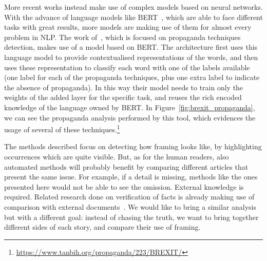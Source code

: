 More recent works instead make use of complex models based on neural networks. With the advance of language models like BERT~\cite{devlin2018bert}, which are able to face different tasks with great results, more models are making use of them for almost every problem in NLP.
The work of~\citet{da2019fine}, which is focused on propaganda techniques detection, makes use of a model based on BERT.
The architecture first uses this language model to provide contextualised representations of the words, and then uses these representation to classify each word with one of the labels available (one label for each of the propaganda techniques, plus one extra label to indicate the absence of propaganda).
In this way their model needs to train only the weights of the added layer for the specific task, and reuses the rich encoded knowledge of the language owned by BERT.
In Figure~\ref{fig:brexit_propaganda}, we can see the propaganda analysis performed by this tool, which evidences the usage of several of these techniques.\footnote{\url{https://www.tanbih.org/propaganda/223/BREXIT/}}

The methods described focus on detecting how framing looks like, by highlighting occurrences which are quite visible.
But, as for the human readers, also automated methods will probably benefit by comparing different articles that present the same issue.
For example, if a detail is missing, methods like the ones presented here would not be able to see the omission.
External knowledge is required.
Related research done on verification of facts is already making use of comparison with external documents~\cite{yin2008truth}.
We would like to bring a similar analysis but with a different goal: instead of chasing the truth, we want to bring together different sides of each story, and compare their use of framing. 









